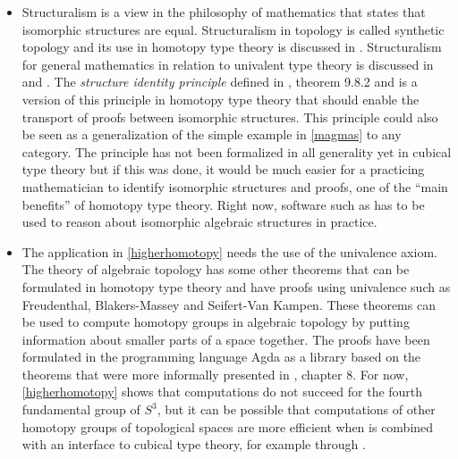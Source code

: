 \documentclass[12pt,a4paper,twoside,xetex]{book} %
\newcommand{\keyword}[1]{\emph{#1}\index{#1}}
\begin{document}
\begin{itemize}
\item Structuralism is a view in the philosophy of mathematics that states that isomorphic structures are equal. Structuralism in topology is called synthetic topology and its use in homotopy type theory is discussed in \cite{Shulman2017}. Structuralism for general mathematics in relation to univalent type theory is discussed in \cite{Awodey2014} and \cite{Tsementzis2016}. The \keyword{structure identity principle} defined in 
\cite{Voevodsky2013}, theorem 9.8.2 and \cite{Aczel2012} is a version of this principle in homotopy type theory that should enable the transport of proofs between isomorphic structures. This principle could also be seen as a 
generalization of the simple example in \cref{magmas} to any category. The 
principle has not been formalized in all generality yet in cubical type theory 
but if this was done, it would be much easier for a practicing mathematician to 
identify isomorphic structures and proofs, one of the ``main benefits'' of homotopy type theory. Right now, software such as \cite{TheGAPGroup2018} has to be used to reason about isomorphic algebraic structures in practice. 

\item The application in \cref{higherhomotopy} needs the use of the univalence 
axiom. The theory of algebraic topology has some other theorems that can be 
formulated in homotopy type theory and have proofs using univalence such as 
Freudenthal, Blakers-Massey and Seifert-Van Kampen. These theorems can be used 
to compute homotopy groups in algebraic topology by putting information about 
smaller parts of a space together. The proofs have been formulated in the 
programming language Agda as a library \cite{HoBr17} based on the theorems that 
were more informally presented in \cite{Voevodsky2013}, chapter 8. For now, 
\cref{higherhomotopy} shows that computations do not succeed for the fourth 
fundamental group of $S^3$, but it can be possible that computations of other 
homotopy groups of topological spaces are more efficient when \cite{HoBr17} is 
combined with an interface to cubical type theory, for example through 
\cite{Moertberg2018}.



\end{itemize}
\end{document}
